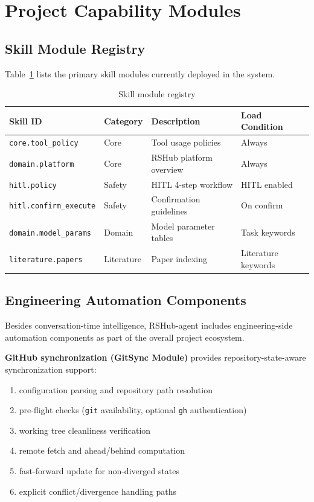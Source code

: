 \section{Project Capability Modules}
\label{sec:capability-modules}

\subsection{Skill Module Registry}
Table~\ref{tab:skill_modules} lists the primary skill modules currently deployed in the system.

\begin{table}[htbp]
	\centering
	\caption{Skill module registry}
	\label{tab:skill_modules}
	\begin{tabular}{llp{5cm}l}
		\toprule
		\textbf{Skill ID} & \textbf{Category} & \textbf{Description} & \textbf{Load Condition} \\
		\midrule
		\texttt{core.tool\_policy} & Core & Tool usage policies & Always \\
		\texttt{domain.platform} & Core & RSHub platform overview & Always \\
		\texttt{hitl.policy} & Safety & HITL 4-step workflow & HITL enabled \\
		\texttt{hitl.confirm\_execute} & Safety & Confirmation guidelines & On confirm \\
		\texttt{domain.model\_params} & Domain & Model parameter tables & Task keywords \\
		\texttt{literature.papers} & Literature & Paper indexing & Literature keywords \\
		\bottomrule
	\end{tabular}
\end{table}

\subsection{Engineering Automation Components}
Besides conversation-time intelligence, RSHub-agent includes engineering-side automation components as part of the overall project ecosystem.

\textbf{GitHub synchronization (GitSync Module)} provides repository-state-aware synchronization support:
\begin{enumerate}
	\item configuration parsing and repository path resolution
	\item pre-flight checks (\texttt{git} availability, optional \texttt{gh} authentication)
	\item working tree cleanliness verification
	\item remote fetch and ahead/behind computation
	\item fast-forward update for non-diverged states
	\item explicit conflict/divergence handling paths
\end{enumerate}

